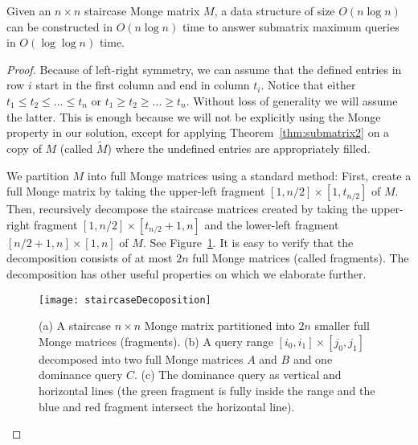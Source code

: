 \documentclass{llncs}
\begin{document}
\begin{theorem}
\label{thm:staircasesubmatrixlarge}
Given an $n\times n$ staircase Monge matrix $M$, a data structure of size $O(n \log n)$ can be constructed
in $O(n \log n)$ time to answer submatrix maximum queries in $O(\log\log n)$ time.
\end{theorem}
\begin{proof}
Because of left-right symmetry, we can assume that the defined entries in row $i$ 
start in the first column and end in column $t_{i}$. Notice that either $t_{1}\le t_{2} \le \ldots \le t_{n}$ or $t_{1}\ge t_{2} \ge \ldots \ge t_{n}$.
Without loss of generality we will assume the latter. This is enough because we will not be explicitly using the Monge property in our
solution, except for applying Theorem~\ref{thm:submatrix2} on a copy of $M$ (called $\widetilde M$) where the undefined entries are
appropriately filled. 
 
We partition $M$ into full Monge matrices using a standard method: First, create a full Monge matrix by taking the upper-left fragment $[1,n/2]\times [1,t_{n/2}]$ of $M$. Then, recursively decompose the staircase  matrices created by taking the upper-right fragment $[1,n/2]\times [t_{n/2}+1,n]$ and the lower-left fragment $[n/2+1,n]\times [1,n]$ of $M$. See Figure~\ref{fig:staircaseDecoposition}. It is easy to verify that
the decomposition consists of at most $2n$ full Monge matrices (called fragments). The decomposition has other useful
properties on which we elaborate further.

\begin{figure}[h]
\begin{center}
\texttt{[image: staircaseDecoposition]}
\end{center}
\caption{(a) A staircase $n\times n$ Monge matrix partitioned into $2n$ smaller full Monge matrices (fragments). (b) A query range $[i_{0},i_{1}]\times  [j_{0},j_{1}]$ decomposed into two full Monge matrices $A$ and $B$ and one dominance query $C$. (c) The dominance query as vertical and horizontal lines (the green fragment is fully inside the range and the blue and red fragment intersect the horizontal line). }
\label{fig:staircaseDecoposition}
\end{figure}


\end{proof}
\end{document}
